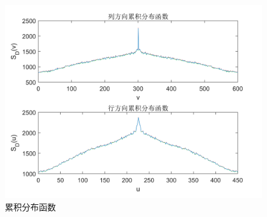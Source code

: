 \documentclass[UTF8]{ctexart}
\begin{document}
        
            			\begin{figure}[H]
            				\centering 
            				\includegraphics[scale=1]{../test/SD.png} 
            				\caption{累积分布函数} 
            				\label{cumulative_distribution_function}
            			\end{figure}                         
\end{document}

